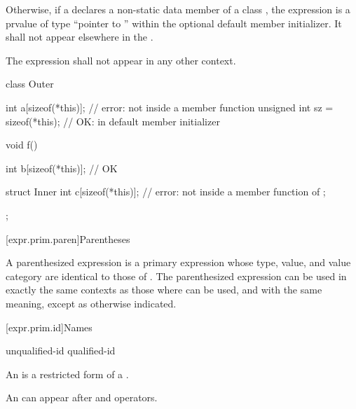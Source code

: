 \pnum
Otherwise, if a  declares a non-static data
member of a class , the expression  is
a prvalue of type ``pointer to '' within the
optional default member initializer. It shall not appear elsewhere
in the .

\pnum
The expression  shall not appear in any other context.
\begin{example}
\begin{codeblock}
class Outer {
  int a[sizeof(*this)];                 // error: not inside a member function
  unsigned int sz = sizeof(*this);      // OK: in default member initializer

  void f() {
    int b[sizeof(*this)];               // OK

    struct Inner {
      int c[sizeof(*this)];             // error: not inside a member function of 
    };
  }
};
\end{codeblock}
\end{example}

[expr.prim.paren]{Parentheses}

\pnum
{}%
A parenthesized expression 
is a primary expression whose type, value, and value category are identical to those of .
The parenthesized expression can be used in exactly the same contexts as
those where  can be used, and with the same
meaning, except as otherwise indicated.

[expr.prim.id]{Names}

\begin{bnf}
\br
    unqualified-id\br
    qualified-id
\end{bnf}

\pnum
{}%
%
An  is a restricted form of a
.
\begin{note}
An  can appear after  and \tcode{->}
operators.
\end{note}

